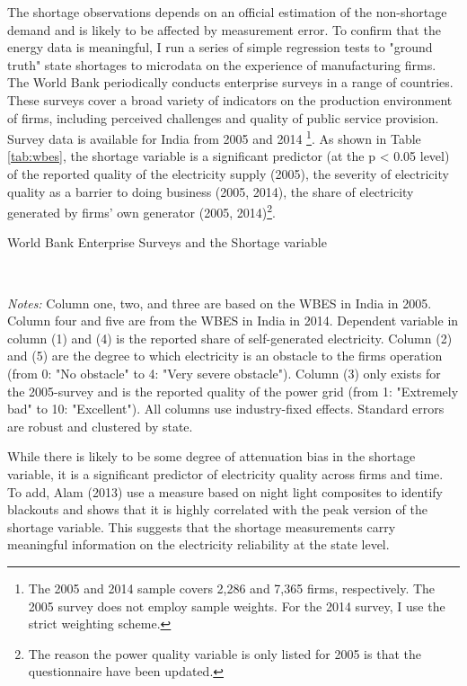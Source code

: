 \documentclass[11pt]{article}
\begin{document}
The shortage observations depends on an official estimation of the non-shortage demand and is likely to be affected by measurement error. To confirm that the energy data is meaningful, I run a series of simple regression tests to "ground truth" state shortages to microdata on the experience of manufacturing firms. 
The World Bank periodically conducts enterprise surveys in a range of countries. These surveys cover a broad variety of indicators on the production environment of firms, including perceived challenges and quality of public service provision. Survey data is available for India from 2005 and 2014 \citep{world_bank_enterprise_2020-1,world_bank_enterprise_2020-2}\footnote{The 2005 and 2014 sample covers 2,286 and 7,365 firms, respectively. The 2005 survey does not employ sample weights. For the 2014 survey, I use the strict weighting scheme.}. As shown in Table \ref{tab:wbes}, the shortage variable is a significant predictor (at the p < 0.05 level) of the reported quality of the electricity supply (2005), the severity of electricity quality as a barrier to doing business (2005, 2014), the share of electricity generated by firms' own generator (2005, 2014)\footnote{The reason the power quality variable is only listed for 2005 is that the questionnaire have been updated.}.

\begin{table}
    \caption{World Bank Enterprise Surveys and the Shortage variable}
    \label{tab:wbes}
    \begin{minipage}{0.95\textwidth} 

    \\
    { \footnotesize \textit{Notes:} Column one, two, and three are based on the WBES in India in 2005. Column four and five are from the WBES in India in 2014. Dependent variable in column (1) and (4) is the reported share of self-generated electricity. Column (2) and (5) are the degree to which electricity is an obstacle to the firms operation (from 0: "No obstacle" to 4: "Very severe obstacle"). Column (3) only exists for the 2005-survey and is the reported quality of the power grid (from 1: "Extremely bad" to 10: "Excellent"). All columns use industry-fixed effects. Standard errors are robust and clustered by state. \\
\par}
    \end{minipage}
\end{table}   

While there is likely to be some degree of attenuation bias in the shortage variable, it is a significant predictor of electricity quality across firms and time. To add, Alam (2013) use a measure based on night light composites to identify blackouts and shows that it is highly correlated with the peak version of the shortage variable. This suggests that the shortage measurements carry meaningful information on the electricity reliability at the state level.
\end{document}
